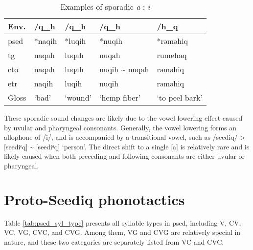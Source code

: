 \begin{table}[!htbp]
\centering
\caption{Examples of sporadic \textit{a} : \textit{i}}
\label{tab:irr_a_i}
\begin{tabular}{lllll}
\hline
Env.      & /q\_h  & /q\_h   & /q\_h            & /h\_q          \\ \hline
\ac{psed} & *naqih & *luqih  & *nuqih           & *rəməhiq       \\ \hdashline
\ac{tg}   & naqah  & luqah   & nuqah            & rumehaq        \\
\ac{cto}  & naqah  & luqah   & nuqih \~{} nuqah & rəməhiq        \\
\ac{etr}  & naqih  & luqih   & nuqih            & rəməhiq        \\ \hline
Gloss     & `bad'  & `wound' & `hemp fiber'     & `to peel bark' \\ \hline
\end{tabular}
\end{table}

These sporadic sound changes are likely due to the vowel lowering effect caused by uvular and pharyngeal consonants. Generally, the vowel lowering forms an allophone of /i/, and is accompanied by a transitional vowel, such as /seediq/ > [seediᵉq] \~{} [seediᵃq] `person'. The direct shift to a single [a] is relatively rare and is likely caused when both preceding and following consonants are either uvular or pharyngeal.

\section{Proto-Seediq phonotactics} \label{sec:psed_phonotactics}

Table \ref{tab:psed_syl_type} presents all syllable types in \acl{psed}, including V, CV, VC, VG, CVC, and CVG. Among them, VG and CVG are relatively special in nature, and these two categories are separately listed from VC and CVC.

